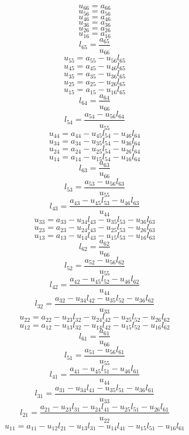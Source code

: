 \documentclass[10pt,a4paper,dvipdfmx]{article}
\begin{document}
\begin{multicols}{2}
\vfill\null
\columnbreak
$$ u_{{6}{6}} = a_{{6}{6}} $$
$$ u_{{5}{6}} = a_{{5}{6}} $$
$$ u_{{4}{6}} = a_{{4}{6}} $$
$$ u_{{3}{6}} = a_{{3}{6}} $$
$$ u_{{2}{6}} = a_{{2}{6}} $$
$$ u_{{1}{6}} = a_{{1}{6}} $$
$$ l_{{6}{5}} = \dfrac{a_{{6}{5}}}{u_{{6}{6}}} $$
$$ u_{{5}{5}} = a_{{5}{5}}- u_{{5}{6}} l_{{6}{5}} $$
$$ u_{{4}{5}} = a_{{4}{5}}- u_{{4}{6}} l_{{6}{5}} $$
$$ u_{{3}{5}} = a_{{3}{5}}- u_{{3}{6}} l_{{6}{5}} $$
$$ u_{{2}{5}} = a_{{2}{5}}- u_{{2}{6}} l_{{6}{5}} $$
$$ u_{{1}{5}} = a_{{1}{5}}- u_{{1}{6}} l_{{6}{5}} $$
$$ l_{{6}{4}} = \dfrac{a_{{6}{4}}}{u_{{6}{6}}} $$
$$ l_{{5}{4}} = \dfrac{a_{{5}{4}}- u_{{5}{6}} l_{{6}{4}}}{u_{{5}{5}}} $$
$$ u_{{4}{4}} = a_{{4}{4}}- u_{{4}{5}} l_{{5}{4}}- u_{{4}{6}} l_{{6}{4}} $$
$$ u_{{3}{4}} = a_{{3}{4}}- u_{{3}{5}} l_{{5}{4}}- u_{{3}{6}} l_{{6}{4}} $$
$$ u_{{2}{4}} = a_{{2}{4}}- u_{{2}{5}} l_{{5}{4}}- u_{{2}{6}} l_{{6}{4}} $$
$$ u_{{1}{4}} = a_{{1}{4}}- u_{{1}{5}} l_{{5}{4}}- u_{{1}{6}} l_{{6}{4}} $$
$$ l_{{6}{3}} = \dfrac{a_{{6}{3}}}{u_{{6}{6}}} $$
$$ l_{{5}{3}} = \dfrac{a_{{5}{3}}- u_{{5}{6}} l_{{6}{3}}}{u_{{5}{5}}} $$
$$ l_{{4}{3}} = \dfrac{a_{{4}{3}}- u_{{4}{5}} l_{{5}{3}}- u_{{4}{6}} l_{{6}{3}}}{u_{{4}{4}}} $$
$$ u_{{3}{3}} = a_{{3}{3}}- u_{{3}{4}} l_{{4}{3}}- u_{{3}{5}} l_{{5}{3}}- u_{{3}{6}} l_{{6}{3}} $$
$$ u_{{2}{3}} = a_{{2}{3}}- u_{{2}{4}} l_{{4}{3}}- u_{{2}{5}} l_{{5}{3}}- u_{{2}{6}} l_{{6}{3}} $$
$$ u_{{1}{3}} = a_{{1}{3}}- u_{{1}{4}} l_{{4}{3}}- u_{{1}{5}} l_{{5}{3}}- u_{{1}{6}} l_{{6}{3}} $$
$$ l_{{6}{2}} = \dfrac{a_{{6}{2}}}{u_{{6}{6}}} $$
$$ l_{{5}{2}} = \dfrac{a_{{5}{2}}- u_{{5}{6}} l_{{6}{2}}}{u_{{5}{5}}} $$
$$ l_{{4}{2}} = \dfrac{a_{{4}{2}}- u_{{4}{5}} l_{{5}{2}}- u_{{4}{6}} l_{{6}{2}}}{u_{{4}{4}}} $$
$$ l_{{3}{2}} = \dfrac{a_{{3}{2}}- u_{{3}{4}} l_{{4}{2}}- u_{{3}{5}} l_{{5}{2}}- u_{{3}{6}} l_{{6}{2}}}{u_{{3}{3}}} $$
$$ u_{{2}{2}} = a_{{2}{2}}- u_{{2}{3}} l_{{3}{2}}- u_{{2}{4}} l_{{4}{2}}- u_{{2}{5}} l_{{5}{2}}- u_{{2}{6}} l_{{6}{2}} $$
$$ u_{{1}{2}} = a_{{1}{2}}- u_{{1}{3}} l_{{3}{2}}- u_{{1}{4}} l_{{4}{2}}- u_{{1}{5}} l_{{5}{2}}- u_{{1}{6}} l_{{6}{2}} $$
$$ l_{{6}{1}} = \dfrac{a_{{6}{1}}}{u_{{6}{6}}} $$
$$ l_{{5}{1}} = \dfrac{a_{{5}{1}}- u_{{5}{6}} l_{{6}{1}}}{u_{{5}{5}}} $$
$$ l_{{4}{1}} = \dfrac{a_{{4}{1}}- u_{{4}{5}} l_{{5}{1}}- u_{{4}{6}} l_{{6}{1}}}{u_{{4}{4}}} $$
$$ l_{{3}{1}} = \dfrac{a_{{3}{1}}- u_{{3}{4}} l_{{4}{1}}- u_{{3}{5}} l_{{5}{1}}- u_{{3}{6}} l_{{6}{1}}}{u_{{3}{3}}} $$
$$ l_{{2}{1}} = \dfrac{a_{{2}{1}}- u_{{2}{3}} l_{{3}{1}}- u_{{2}{4}} l_{{4}{1}}- u_{{2}{5}} l_{{5}{1}}- u_{{2}{6}} l_{{6}{1}}}{u_{{2}{2}}} $$
$$ u_{{1}{1}} = a_{{1}{1}}- u_{{1}{2}} l_{{2}{1}}- u_{{1}{3}} l_{{3}{1}}- u_{{1}{4}} l_{{4}{1}}- u_{{1}{5}} l_{{5}{1}}- u_{{1}{6}} l_{{6}{1}} $$
\end{multicols}
\end{document}
